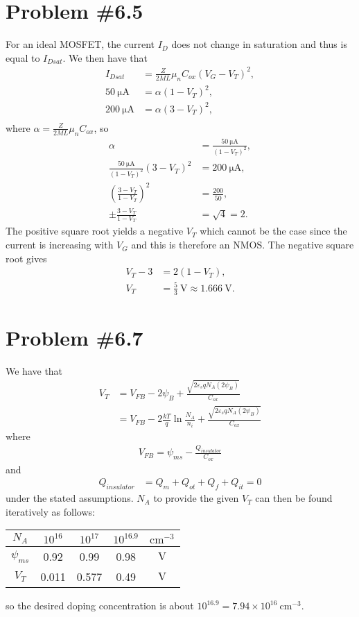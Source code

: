 \documentclass{article}
\begin{document}
\section*{Problem \#6.5}
For an ideal MOSFET, the current $I_D$ does not change in saturation and thus
is equal to $I_{Dsat}$. We then have that
\begin{align*}
I_{Dsat} &= \frac{Z}{2ML}\mu_n C_{ox}(V_G - V_T)^2, \\
50 ~\mathrm{\mu A} &= \alpha(1 - V_T)^2, \\
200  ~\mathrm{\mu A} &= \alpha (3 - V_T)^2, \\
\end{align*}
where $\alpha = \frac{Z}{2ML}\mu_n C_{ox}$, so
\begin{align*}
\alpha &= \frac{50 ~\mathrm{\mu A}}{(1 - V_T)^2}, \\
\frac{50 ~\mathrm{\mu A}}{(1 - V_T)^2} (3 - V_T)^2 &= 200 ~\mathrm{\mu A}, \\
\left(\frac{3 - V_T}{1 - V_T}\right)^2 &= \frac{200}{50},  \\
\pm\frac{3 - V_T}{1 - V_T} &= \sqrt{4} = 2.
\end{align*}
The positive square root yields a negative $V_T$ which cannot be the case 
since the current is increasing with $V_G$ and this is therefore an NMOS. The
negative square root gives
\begin{align*}
V_T - 3 &= 2(1 - V_T), \\
V_T &= \frac{5}{3} ~\mathrm{V} \approx 1.666 ~\mathrm{V}.
\end{align*}

\section*{Problem \#6.7}

We have that
\begin{align*}
V_T &= V_{FB} - 2\psi_{B} + \frac{\sqrt{2 \varepsilon_s q N_A (2\psi_B)}}{C_{ox}} \\
    &= V_{FB}
     - 2\frac{kT}{q} \ln \frac{N_A}{n_i}
     + \frac{\sqrt{2 \varepsilon_s q N_A (2 \psi_B)}}{C_{ox}}
\end{align*}
where
\begin{align*}
V_{FB} = \psi_{ms} - \frac{Q_{insulator}}{C_{ox}}
\end{align*}
and
\begin{align*}
Q_{insulator} &= Q_m + Q_{ot} + Q_f + Q_{it} = 0
\end{align*}
under the stated assumptions. $N_A$ to provide the given $V_T$ can then be
found iteratively as follows:

\begin{tabular}{c | c c c c}
$N_A$       & $10^{16}$ & $10^{17}$ & $10^{16.9}$ & $\mathrm{cm}^{-3}$\\
\hline
$\psi_{ms}$ & 0.92      & 0.99      & 0.98         & $\mathrm{V}$ \\
$V_T$       & 0.011     & 0.577     & 0.49         & $\mathrm{V}$
\end{tabular}

so the desired doping concentration is about 
$10^{16.9} = 7.94 \times 10^{16} ~\mathrm{cm}^{-3}$.
\end{document}

